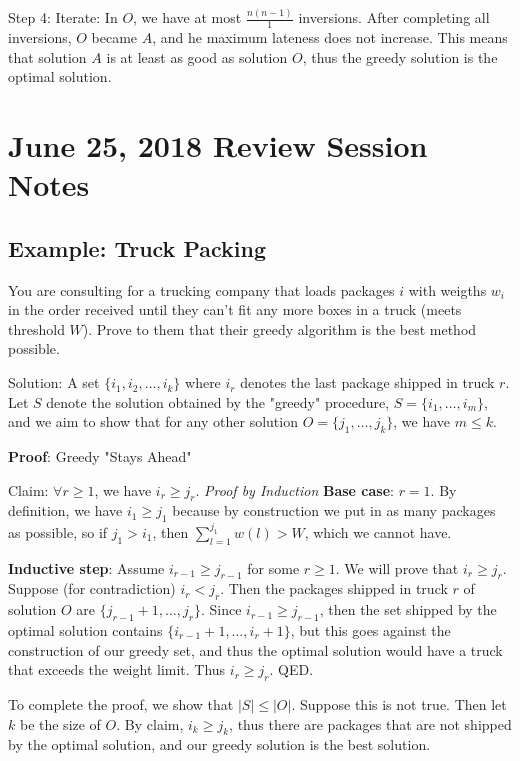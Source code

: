 \documentclass[11pt,letterpaper]{article}
\begin{document}
Step 4: Iterate: In $O$, we have at most $\frac{n(n-1)}{1}$ inversions. After completing all inversions, $O$ became $A$, and he maximum lateness does not increase. This means that solution $A$ is at least as good as solution $O$, thus the greedy solution is the optimal solution. 

\section{June 25, 2018 Review Session Notes}
\subsection*{Example: Truck Packing}
You are consulting for a trucking company that loads packages $i$ with weigths $w_i$ in the order received until they can't fit any more boxes in a truck (meets threshold $W$). Prove to them that their greedy algorithm is the best method possible.
 
Solution: A set $\{ i_1, i_2, \ldots, i_k \}$ where $i_r$ denotes the last package shipped in truck $r$. Let $S$ denote the solution obtained by the "greedy" procedure, $S = \{ i_1, \ldots, i_m\}$, and we aim to show that for any other solution $O = \{ j_1, \ldots, j_k \}$, we have $m \leq k$. 

\textbf{Proof}: Greedy "Stays Ahead"

Claim: $\forall r \geq 1$, we have $i_r \geq j_r$. \textit{Proof by Induction} \textbf{Base case}: $r = 1$. By definition, we have $i_1 \geq j_1$ because by construction we put in as many packages as possible, so if $j_1 > i_1$, then $\sum_{l=1}^{j_1}w(l) > W$, which we cannot have. 

\textbf{Inductive step}: Assume $i_{r-1} \geq j_{r-1}$ for some $r \geq 1$. We will prove that $i_{r} \geq j_{r}$. Suppose (for contradiction) $i_r < j_r$. Then the packages shipped in truck $r$ of solution $O$ are $\{ j_{r-1}+1,\ldots,j_r \}$. Since $i_{r-1} \geq j_{r-1}$, then the set shipped by the optimal solution contains $\{ i_{r-1} + 1,\ldots, i_r + 1\}$, but this goes against the construction of our greedy set, and thus the optimal solution would have a truck that exceeds the weight limit. Thus $i_r \geq j_r$. QED. 

To complete the proof, we show that $|S| \leq |O|$. Suppose this is not true. Then let $k$ be the size of $O$. By claim, $i_k \geq j_k$, thus there are packages that are not shipped by the optimal solution, and our greedy solution is the best solution. 
\end{document}
